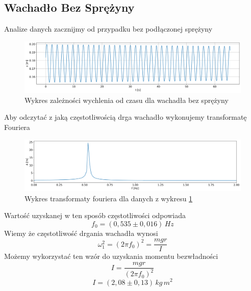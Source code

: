 \documentclass[12pt]{article}
\begin{document}
\subsection{Wachadło Bez Sprężyny}

Analize danych zacznijmy od przypadku bez podłączonej sprężyny
\begin{figure}[H]
    \centering
    \includegraphics[width=\linewidth]{no_spring}
    \caption{Wykres zależności wychlenia od czasu dla wachadła bez sprężyny}
    \label{fig:pendulum_nospring}
\end{figure}
Aby odczytać z jaką częstotliwością drga wachadło wykonujemy transformatę Fouriera
\begin{figure}[H]
    \centering
    \includegraphics[width=\linewidth]{no_spring_fft}
    \caption{Wykres transformaty fouriera dla danych z wykresu \ref{fig:pendulum_nospring}}
    \label{fig:pendulum_nospring_fft}
\end{figure}
Wartość uzyskanej w ten sposób częstotliwości odpowiada
\[
    f_0 = (0{,}535 \pm 0{,}016) \, Hz
\]
Wiemy że częstotliwość drgania wachadła wynosi\cite{skrypt}
\[
    \omega_1^2 = (2\pi f_0)^2 = \frac{mgr}{I}
\]
Możemy wykorzystać ten wzór do uzyskania momentu bezwładności 
\[
    I = \frac{mgr}{(2\pi f_0)^2}
\]
\[
    I = (2{,}08 \pm 0{,}13) \, kg \, m^2
\]
\end{document}
